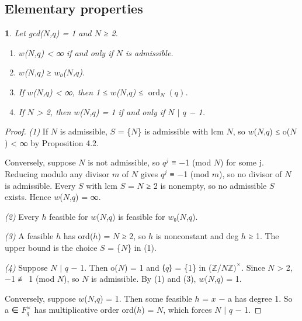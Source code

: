 \documentclass[pdflatex,sn-mathphys-num]{sn-jnl}
\providecommand{\tightlist}{\setlength{\itemsep}{0pt}\setlength{\parskip}{0pt}}
\theoremstyle{thmstyleone}
\newcommand{\thmxname}{}
\newtheorem*{thmxinner}{\thmxname}
\newenvironment{thmx}[1]{\renewcommand{\thmxname}{#1}\begin{thmxinner}}{\end{thmxinner}}
\theoremstyle{thmstylethree}
\begin{document}
\subsection{Elementary properties}

\begin{thmx}{Proposition 4.3}

Let gcd(\(N\),\(q\)) = 1 and \(N\) ≥ 2.

\begin{enumerate}
\def\labelenumi{\arabic{enumi}.}
\tightlist
\item
  \(w\)(\(N\),\(q\)) \textless{} ∞ if and only if \(N\) is admissible.
\item
  \(w\)(\(N\),\(q\)) ≥ \(w\)₀(\(N\),\(q\)).
\item
  If \(w\)(\(N\),\(q\)) \textless{} ∞, then 1 ≤ \(w\)(\(N\),\(q\)) ≤ \(\operatorname{ord}_N(q)\).
\item
  If \(N\) \textgreater{} 2, then \(w\)(\(N\),\(q\)) = 1 if and only if \(N\) \(\mid\) \(q\) − 1.
\end{enumerate}

\end{thmx}

\begin{proof}[Proof]

\emph{(1)} If \(N\) is admissible, \(S\) = \{\(N\)\} is admissible with lcm \(N\), so \(w\)(\(N\),\(q\)) ≤ o(\(N\)) \textless{} ∞ by Proposition 4.2.

Conversely, suppose \(N\) is not admissible, so \(q^j\) ≡ −1 (mod \(N\)) for some j. Reducing modulo any divisor \(m\) of \(N\) gives \(q^j\) ≡ −1 (mod \(m\)), so no divisor of \(N\) is admissible. Every \(S\) with lcm \(S\) = \(N\) ≥ 2 is nonempty, so no admissible \(S\) exists. Hence \(w\)(\(N\),\(q\)) = ∞.

\emph{(2)} Every \(h\) feasible for \(w\)(\(N\),\(q\)) is feasible for \(w\)₀(\(N\),\(q\)).

\emph{(3)} A feasible \(h\) has ord(\(h\)) = \(N\) ≥ 2, so \(h\) is nonconstant and deg \(h\) ≥ 1. The upper bound is the choice \(S\) = \{\(N\)\} in (1).

\emph{(4)} Suppose \(N\) \(\mid\) \(q\) − 1. Then o(\(N\)) = 1 and ⟨\(q\)⟩ = \{1\} in (\(ℤ/Nℤ)^×\). Since \(N\) \textgreater{} 2, −1 ≢ 1 (mod \(N\)), so \(N\) is admissible. By (1) and (3), \(w\)(\(N\),\(q\)) = 1.

Conversely, suppose \(w\)(\(N\),\(q\)) = 1. Then some feasible \(h\) = \(x\) − a has degree 1. So a ∈ \(F_q^×\) has multiplicative order ord(\(h\)) = \(N\), which forces \(N\) \(\mid\) \(q\) − 1.

\end{proof}
\end{document}
